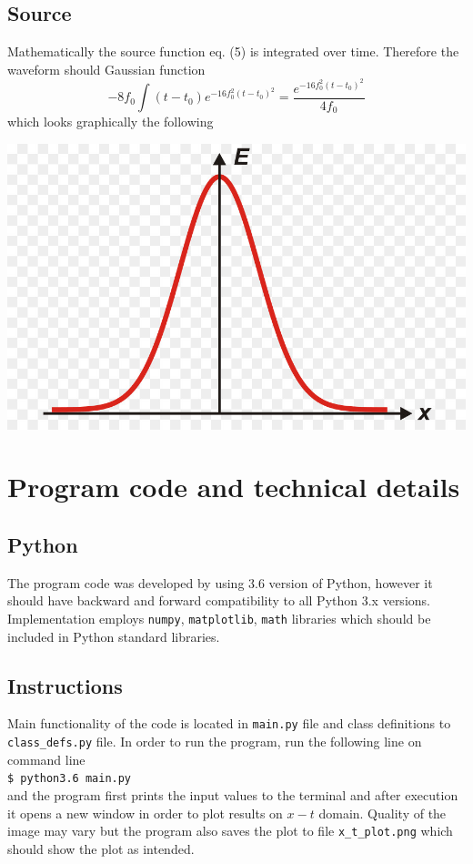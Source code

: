 \documentclass[]{article}
\begin{document}
\subsection{Source}
Mathematically the source function eq. (5) is integrated over time. Therefore the waveform should Gaussian function
\begin{equation}
	-8 f_0\int\left(t-t_0\right)e^{-16f_0^2\left(t-t_0\right)^2}=\frac{e^{-16f_0^2\left(t-t_0\right)^2}}{4f_0}
\end{equation}
which looks graphically the following
\begin{center}
	\includegraphics[width=1.0\linewidth]{gaussian}
\end{center}


\newpage

\section{Program code and technical details}

\subsection{Python}
The program code was developed by using 3.6 version of Python, however it should have backward and forward compatibility to all Python 3.x versions. Implementation employs \texttt{numpy}, \texttt{matplotlib}, \texttt{math} libraries which should be included in Python standard libraries.

\subsection{Instructions}
Main functionality of the code is located in \texttt{main.py} file and class definitions to \texttt{class\_defs.py} file. In order to run the program, run the following line on command line \\
\texttt{\$ python3.6 main.py} \\
and the program first prints the input values to the terminal and after execution it opens a new window in order to plot results on $x-t$ domain. Quality of the image may vary but the program also saves the plot to file \texttt{x\_t\_plot.png} which should show the plot as intended.
\end{document}
